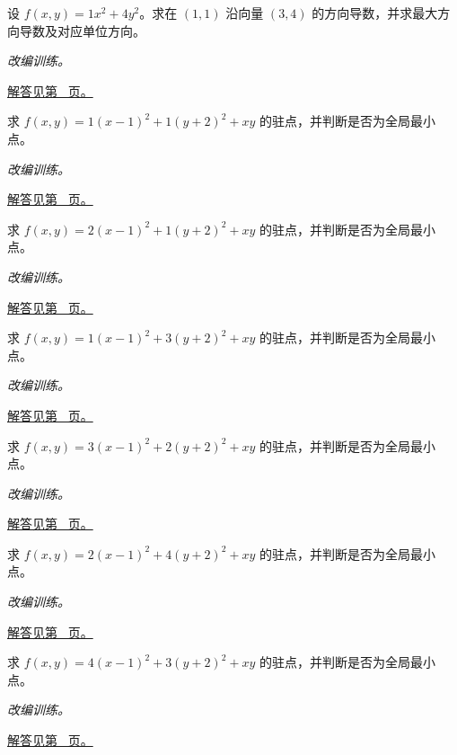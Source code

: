 \documentclass[12pt,fontset=fandol]{ctexart}
\begin{document}
\begin{example}[梯度与最陡方向]\label{ex:c34q13}
设 $f(x,y)=1x^2+4y^2$。求在 $(1,1)$ 沿向量 $(3,4)$ 的方向导数，并求最大方向导数及对应单位方向。
\par\textit{改编训练。}\par\hyperref[ans:c34q13]{解答见第~\pageref{ans:c34q13} 页。}
\end{example}
\begin{example}[正定二次型的极小值]\label{ex:c34q14}
求 $f(x,y)=1(x-1)^2+1(y+2)^2+xy$ 的驻点，并判断是否为全局最小点。
\par\textit{改编训练。}\par\hyperref[ans:c34q14]{解答见第~\pageref{ans:c34q14} 页。}
\end{example}
\begin{example}[正定二次型的极小值]\label{ex:c34q15}
求 $f(x,y)=2(x-1)^2+1(y+2)^2+xy$ 的驻点，并判断是否为全局最小点。
\par\textit{改编训练。}\par\hyperref[ans:c34q15]{解答见第~\pageref{ans:c34q15} 页。}
\end{example}
\begin{example}[正定二次型的极小值]\label{ex:c34q16}
求 $f(x,y)=1(x-1)^2+3(y+2)^2+xy$ 的驻点，并判断是否为全局最小点。
\par\textit{改编训练。}\par\hyperref[ans:c34q16]{解答见第~\pageref{ans:c34q16} 页。}
\end{example}
\begin{example}[正定二次型的极小值]\label{ex:c34q17}
求 $f(x,y)=3(x-1)^2+2(y+2)^2+xy$ 的驻点，并判断是否为全局最小点。
\par\textit{改编训练。}\par\hyperref[ans:c34q17]{解答见第~\pageref{ans:c34q17} 页。}
\end{example}
\begin{example}[正定二次型的极小值]\label{ex:c34q18}
求 $f(x,y)=2(x-1)^2+4(y+2)^2+xy$ 的驻点，并判断是否为全局最小点。
\par\textit{改编训练。}\par\hyperref[ans:c34q18]{解答见第~\pageref{ans:c34q18} 页。}
\end{example}
\begin{example}[正定二次型的极小值]\label{ex:c34q19}
求 $f(x,y)=4(x-1)^2+3(y+2)^2+xy$ 的驻点，并判断是否为全局最小点。
\par\textit{改编训练。}\par\hyperref[ans:c34q19]{解答见第~\pageref{ans:c34q19} 页。}
\end{example}
\end{document}
